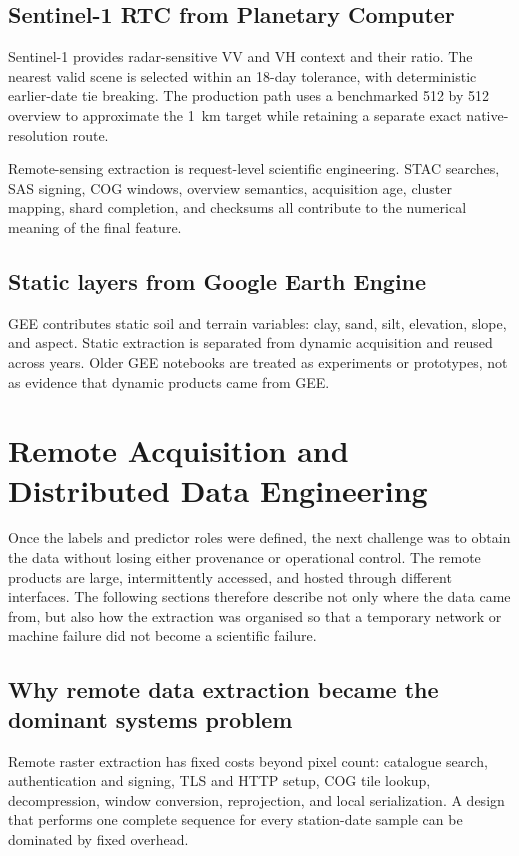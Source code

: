 \documentclass[12pt,a4paper]{report}
\newcommand{\feat}[1]{#1\par}
\begin{document}
\subsection{Sentinel-1 RTC from Planetary Computer}
Sentinel-1 provides radar-sensitive VV and VH context and their ratio. The
nearest valid scene is selected within an 18-day tolerance, with deterministic
earlier-date tie breaking. The production path uses a benchmarked 512 by 512
overview to approximate the 1~km target while retaining a separate exact
native-resolution route.

\feat{Remote-sensing extraction is request-level scientific engineering. STAC
searches, SAS signing, COG windows, overview semantics, acquisition age,
cluster mapping, shard completion, and checksums all contribute to the numerical
meaning of the final feature.}

\subsection{Static layers from Google Earth Engine}
GEE contributes static soil and terrain variables: clay, sand, silt, elevation,
slope, and aspect. Static extraction is separated from dynamic acquisition and
reused across years. Older GEE notebooks are treated as experiments or
prototypes, not as evidence that dynamic products came from GEE.

\section{Remote Acquisition and Distributed Data Engineering}

Once the labels and predictor roles were defined, the next challenge was to
obtain the data without losing either provenance or operational control. The
remote products are large, intermittently accessed, and hosted through
different interfaces. The following sections therefore describe not only where
the data came from, but also how the extraction was organised so that a
temporary network or machine failure did not become a scientific failure.

\subsection{Why remote data extraction became the dominant systems problem}
Remote raster extraction has fixed costs beyond pixel count: catalogue search,
authentication and signing, TLS and HTTP setup, COG tile lookup, decompression,
window conversion, reprojection, and local serialization. A design that performs
one complete sequence for every station-date sample can be dominated by fixed
overhead.
\end{document}
